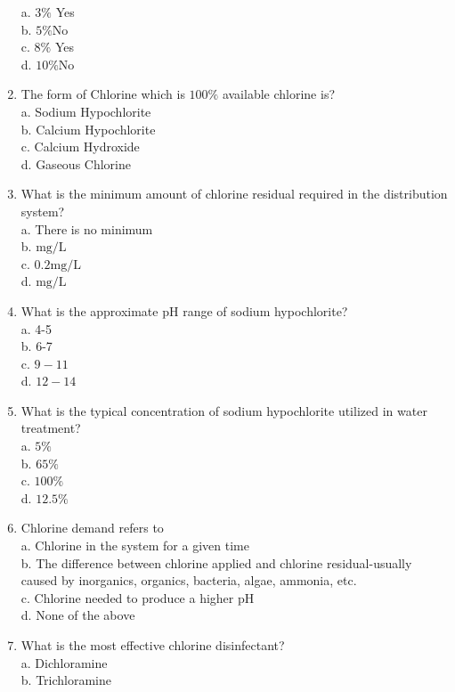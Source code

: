 \begin{enumerate}[1.]
a. $3 \%$ Yes\\
b. $5 \% \mathrm{No}$\\
c. $8 \%$ Yes\\
d. $10 \% \mathrm{No}$\\
\item The form of Chlorine which is $100 \%$ available chlorine is?\\
a. Sodium Hypochlorite\\
b. Calcium Hypochlorite\\
c. Calcium Hydroxide\\
d. Gaseous Chlorine\\
\item What is the minimum amount of chlorine residual required in the distribution system?\\
a. There is no minimum\\
b. $\mathrm{mg} / \mathrm{L}$\\
c. $0.2 \mathrm{mg} / \mathrm{L}$\\
d. $\mathrm{mg} / \mathrm{L}$\\
\item What is the approximate $\mathrm{pH}$ range of sodium hypochlorite?\\
a. 4-5\\
b. 6-7\\
c. $9-11$\\
d. $12-14$\\
\item What is the typical concentration of sodium hypochlorite utilized in water treatment?\\
a. $5 \%$\\
b. $65 \%$\\
c. $100 \%$\\
d. $12.5 \%$\\
\item Chlorine demand refers to\\
a. Chlorine in the system for a given time\\
b. The difference between chlorine applied and chlorine residual-usually caused by inorganics, organics, bacteria, algae, ammonia, etc.\\
c. Chlorine needed to produce a higher $\mathrm{pH}$\\
d. None of the above\\
\item What is the most effective chlorine disinfectant?\\
a. Dichloramine\\
b. Trichloramine\\

\end{enumerate}
